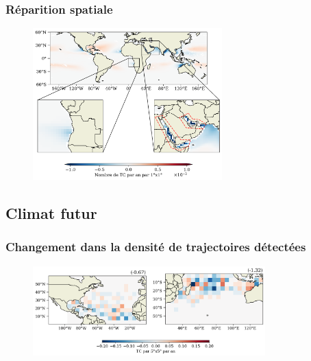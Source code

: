 \documentclass[aspectratio=169, usepdftitle=false, xcolor={dvipsnames}, 9pt,table]{beamer}
\begin{document}
\begin{frame}[c]
    \frametitle{Réparition spatiale}
    \begin{figure}
        \centering
        \includegraphics[width=0.65\textwidth]{Figures/Annexes/carte_diff_VPD_AM10.png}
    \end{figure} 
\end{frame}

\subsection*{Climat futur}
\begin{frame}[c]
    \frametitle{Changement dans la densité de trajectoires détectées}
    \begin{figure}
        \centering
        \includegraphics[width=0.8\textwidth]{Figures/Annexes/diff_density.png}
    \end{figure} 
\end{frame}
\end{document}
